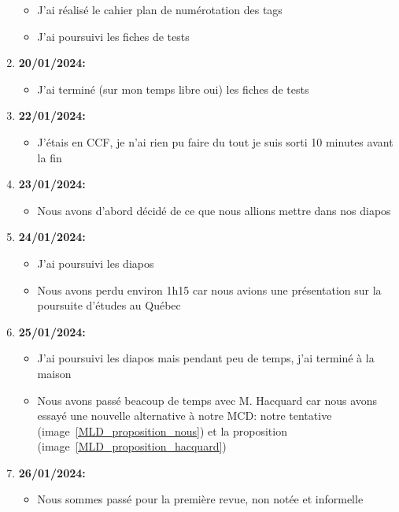 \documentclass[10pt,a4paper]{article}
\begin{document}
\begin{enumerate}
\begin{itemize}
            \item J'ai réalisé le cahier plan de numérotation des tags
            \item J'ai poursuivi les fiches de tests
        \end{itemize}
    \item \textbf{20/01/2024:}
        \begin{itemize}
            \item J'ai terminé (sur mon temps libre oui) les fiches de tests
        \end{itemize}
    \item \textbf{22/01/2024:}
        \begin{itemize}
            \item J'étais en CCF, je n'ai rien pu faire du tout je suis sorti 10 minutes avant la fin
        \end{itemize}
    \item \textbf{23/01/2024:}
        \begin{itemize}
            \item Nous avons d'abord décidé de ce que nous allions mettre dans nos diapos
        \end{itemize}
    \item \textbf{24/01/2024:}
        \begin{itemize}
            \item J'ai poursuivi les diapos
            \item Nous avons perdu environ 1h15 car nous avions une présentation sur la poursuite d'études au Québec
        \end{itemize}
    \item \textbf{25/01/2024:}
        \begin{itemize}
            \item J'ai poursuivi les diapos mais pendant peu de temps, j'ai terminé à la maison
            \item Nous avons passé beacoup de temps avec M. Hacquard car nous avons essayé une nouvelle alternative à notre MCD: notre tentative (image~\ref{MLD_proposition_nous}) et la proposition (image~\ref{MLD_proposition_hacquard})
        \end{itemize}
    \item \textbf{26/01/2024:}
        \begin{itemize}
            \item Nous sommes passé pour la première revue, non notée et informelle
        \end{itemize}

\end{enumerate}
\end{document}
